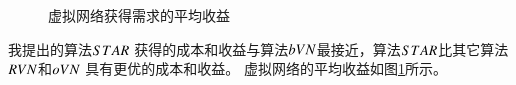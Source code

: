 \begin{figure}[htbp]
\begin{minipage}{0.4\textwidth}
\caption{虚拟网络获得需求的平均收益}\label{fig:RevenueAccumulateAverageVirtualNetwork}
\end{minipage}\vspace{\baselineskip}
\end{figure}
我提出的算法$STAR$ 获得的成本和收益与算法$bVN$最接近，算法$STAR$比其它算法$RVN$和$oVN$ 具有更优的成本和收益。
虚拟网络的平均收益如图\ref{fig:RevenueAccumulateAverageVirtualNetwork}所示。



